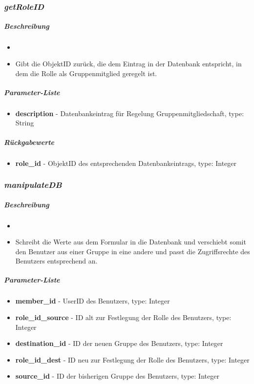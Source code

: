 \subsubsection*{\textit{getRoleID}}\label{getRoleIDMGUI}
\subparagraph{Beschreibung}
\begin{itemize}
	\item[] \noindent{} 
	\item[] Gibt die ObjektID zurück, die dem Eintrag in der Datenbank entspricht, in dem die Rolle als Gruppenmitglied geregelt ist. 
\end{itemize}
\subparagraph{Parameter-Liste}
\begin{itemize}
	\item[] \textbf{description} - Datenbankeintrag für Regelung Gruppenmitgliedschaft, type: String
\end{itemize}
\subparagraph{Rückgabewerte}
\begin{itemize}
	\item[] \textbf{role\_id} - ObjektID des entsprechenden Datenbankeintrags, type: Integer
\end{itemize}

\subsubsection*{\textit{manipulateDB}}\label{manipulateDBMGUI}
\subparagraph{Beschreibung}
\begin{itemize}
	\item[] \noindent{} 
	\item[] Schreibt die Werte aus dem Formular in die Datenbank und verschiebt somit den Benutzer aus einer Gruppe in eine andere und passt die Zugriffsrechte des Benutzers entsprechend an.
\end{itemize}
\subparagraph{Parameter-Liste}
\begin{itemize}
	\item[] \textbf{member\_id} - UserID des Benutzers, type: Integer
	\item[] \textbf{role\_id\_source} - ID alt zur Festlegung der Rolle des Benutzers, type: Integer
	\item[] \textbf{destination\_id} - ID der neuen Gruppe des Benutzers, type: Integer
	\item[] \textbf{role\_id\_dest} - ID neu zur Festlegung der Rolle des Benutzers, type: Integer
	\item[] \textbf{source\_id} - ID der bisherigen Gruppe des Benutzers, type: Integer
\end{itemize}

